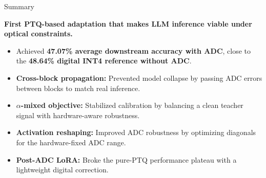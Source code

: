 \begin{frame}{Summary}

\textbf{First PTQ-based adaptation that makes LLM inference viable
under optical constraints.}

\vspace{0.9em}

\begin{itemize}
    \item Achieved \textbf{47.07\% average downstream accuracy with ADC},
    close to the \textbf{48.64\% digital INT4 reference without ADC}.

    \item \textbf{Cross-block propagation:} Prevented model collapse by passing 
    ADC errors between blocks to match real inference.

    \item \textbf{$\alpha$-mixed objective:} Stabilized calibration by balancing 
    a clean teacher signal with hardware-aware robustness.

    \item \textbf{Activation reshaping:} Improved ADC robustness by optimizing 
    diagonals for the hardware-fixed ADC range.

    \item \textbf{Post-ADC LoRA:} Broke the pure-PTQ performance plateau with 
    a lightweight digital correction.
\end{itemize}

\end{frame}
